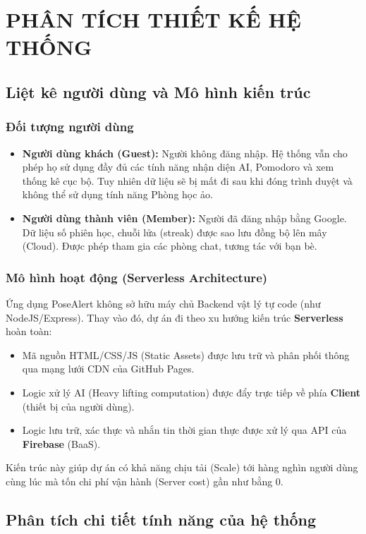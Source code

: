 \documentclass[12pt,a4paper]{report}
\begin{document}
\chapter{PHÂN TÍCH THIẾT KẾ HỆ THỐNG}

\section{Liệt kê người dùng và Mô hình kiến trúc}
\subsection{Đối tượng người dùng}
\begin{itemize}
    \item \textbf{Người dùng khách (Guest):} Người không đăng nhập. Hệ thống vẫn cho phép họ sử dụng đầy đủ các tính năng nhận diện AI, Pomodoro và xem thống kê cục bộ. Tuy nhiên dữ liệu sẽ bị mất đi sau khi đóng trình duyệt và không thể sử dụng tính năng Phòng học ảo.
    \item \textbf{Người dùng thành viên (Member):} Người đã đăng nhập bằng Google. Dữ liệu số phiên học, chuỗi lửa (streak) được sao lưu đồng bộ lên mây (Cloud). Được phép tham gia các phòng chat, tương tác với bạn bè.
\end{itemize}

\subsection{Mô hình hoạt động (Serverless Architecture)}
Ứng dụng PoseAlert không sở hữu máy chủ Backend vật lý tự code (như NodeJS/Express). Thay vào đó, dự án đi theo xu hướng kiến trúc \textbf{Serverless} hoàn toàn:
\begin{itemize}
    \item Mã nguồn HTML/CSS/JS (Static Assets) được lưu trữ và phân phối thông qua mạng lưới CDN của GitHub Pages.
    \item Logic xử lý AI (Heavy lifting computation) được đẩy trực tiếp về phía \textbf{Client} (thiết bị của người dùng).
    \item Logic lưu trữ, xác thực và nhắn tin thời gian thực được xử lý qua API của \textbf{Firebase} (BaaS).
\end{itemize}
Kiến trúc này giúp dự án có khả năng chịu tải (Scale) tới hàng nghìn người dùng cùng lúc mà tốn chi phí vận hành (Server cost) gần như bằng 0.

\section{Phân tích chi tiết tính năng của hệ thống}
\end{document}
